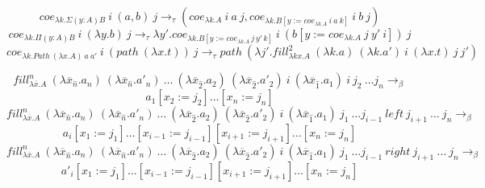\documentclass{amsart}
\theoremstyle{definition}
\theoremstyle{remark}
\numberwithin{figure}{section}
\begin{document}
\begin{comment}
\begin{align*}
& fill^1_{\lambda x_1. A}\ i\ a_1\ j_1 = coe_{\lambda x_1. A}\ i\ a_1\ j_1 \\
& fill^{n+1}_{\lambda \overline{x}_{n+1}. A}\ (\lambda \overline{x}_n. a_{n+1})\ (\lambda \overline{x}_n. a'_{n+1}) \ldots (\lambda \overline{x}_n. a_2)\ (\lambda \overline{x}_n. a'_2)\ i\ (\lambda \overline{x}_n. a_1)\ j_1 \ldots j_{n+1} = \\
& \indent fill^n_{\lambda \overline{x}_n. Path\ (\lambda x_{n+1}. A)\ a_{n+1}\ a'_{n+1}} \\
& \indent (\lambda \overline{x}_{n-1}. path (\lambda x_n. a_n))\ (\lambda \overline{x}_{n-1}. path (\lambda x_n. a'_n)) \ldots \\
& \indent (\lambda \overline{x}_{n-1}. path (\lambda x_n. a_2))\ (\lambda \overline{x}_{n-1}. path (\lambda x_n. a'_2)) \\
& \indent i\ (\lambda \overline{x}_{n-1}. path (\lambda x_n. a_1))\ j_1 \ldots j_n\ @\ j_{n+1}
\end{align*}
\end{comment}

\[ coe_{\lambda k. \Sigma (y : A) B}\ i\ (a, b)\ j \to_\tau (coe_{\lambda k. A}\ i\ a\ j, coe_{\lambda k. B[y := coe_{\lambda k. A}\ i\ a\ k]}\ i\ b\ j) \]
\[ coe_{\lambda k. \Pi (y : A) B}\ i\ (\lambda y. b)\ j \to_\tau \lambda y'. coe_{\lambda k. B[y := coe_{\lambda k. A}\,j\,y'\,k]}\ i\ (b[y := coe_{\lambda k. A}\ j\ y'\ i])\ j \]
\[ coe_{\lambda k. Path\ (\lambda x. A)\ a\ a'}\ i\ (path\ (\lambda x. t))\ j \to_\tau path\ (\lambda j'. fill^2_{\lambda k x. A}\ (\lambda k. a)\ (\lambda k. a')\ i\ (\lambda x. t)\ j\ j') \]

\[ fill^n_{\lambda \overline{x}. A}\ (\lambda \overline{x}_{\hat{n}}. a_n)\ (\lambda \overline{x}_{\hat{n}}. a'_n)\ \ldots\ (\lambda \overline{x}_{\hat{2}}. a_2)\ (\lambda \overline{x}_{\hat{2}}. a'_2)\ i\ (\lambda \overline{x}_{\hat{1}}. a_1)\ i\ j_2\ \ldots j_n \to_\beta \]
\[ a_1[x_2 := j_2] \ldots [x_n := j_n] \]
\[ fill^n_{\lambda \overline{x}. A}\ (\lambda \overline{x}_{\hat{n}}. a_n)\ (\lambda \overline{x}_{\hat{n}}. a'_n)\ \ldots\ (\lambda \overline{x}_{\hat{2}}. a_2)\ (\lambda \overline{x}_{\hat{2}}. a'_2)\ i\ (\lambda \overline{x}_{\hat{1}}. a_1)\ j_1\ \ldots j_{i-1}\ left\ j_{i+1}\ \ldots\ j_n \to_\beta \]
\[ a_i[x_1 := j_1] \ldots [x_{i-1} := j_{i-1}] [x_{i+1} := j_{i+1}] \ldots [x_n := j_n] \]
\[ fill^n_{\lambda \overline{x}. A}\ (\lambda \overline{x}_{\hat{n}}. a_n)\ (\lambda \overline{x}_{\hat{n}}. a'_n)\ \ldots\ (\lambda \overline{x}_{\hat{2}}. a_2)\ (\lambda \overline{x}_{\hat{2}}. a'_2)\ i\ (\lambda \overline{x}_{\hat{1}}. a_1)\ j_1\ \ldots j_{i-1}\ right\ j_{i+1}\ \ldots\ j_n \to_\beta \]
\[ a'_i[x_1 := j_1] \ldots [x_{i-1} := j_{i-1}] [x_{i+1} := j_{i+1}] \ldots [x_n := j_n] \]
\end{document}
